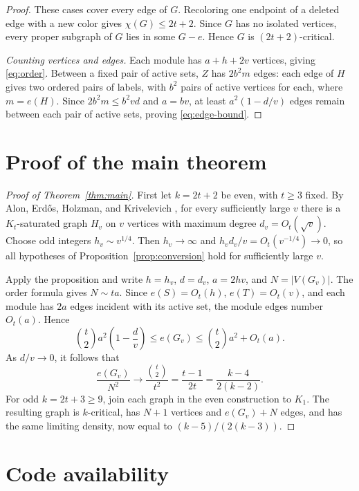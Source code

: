\documentclass[11pt]{article}
\numberwithin{equation}{section}
\begin{document}
\begin{proof}
These cases cover every edge of \(G\). Recoloring one endpoint
of a deleted edge with a new color gives \(\chi(G)\le2t+2\).
Since \(G\) has no isolated vertices, every proper subgraph of
\(G\) lies in some \(G-e\). Hence \(G\) is \((2t+2)\)-critical.

\smallskip
\noindent\emph{Counting vertices and edges.}
Each module has \(a+h+2v\) vertices, giving \eqref{eq:order}.
Between a fixed pair of active sets, \(Z\) has \(2b^2m\) edges:
each edge of \(H\) gives two ordered pairs of labels, with
\(b^2\) pairs of active vertices for each, where \(m=e(H)\).
Since \(2b^2m\le b^2vd\) and \(a=bv\), at least
\(a^2(1-d/v)\) edges remain between each pair of active sets,
proving \eqref{eq:edge-bound}.
\end{proof}

\section{Proof of the main theorem}
\label{sec:main-proof}

\begin{proof}[Proof of Theorem~\ref{thm:main}]
First let \(k=2t+2\) be even, with \(t\ge3\) fixed.
By Alon, Erd\H{o}s, Holzman, and Krivelevich
\cite[Theorem~7]{AEHK}, for every sufficiently large \(v\) there
is a \(K_t\)-saturated graph \(H_v\) on \(v\) vertices with
maximum degree \(d_v=O_t(\sqrt v)\).
Choose odd integers \(h_v\sim v^{1/4}\). Then \(h_v\to\infty\)
and \(h_vd_v/v=O_t(v^{-1/4})\to0\), so all hypotheses of
Proposition~\ref{prop:conversion} hold for sufficiently large \(v\).

Apply the proposition and write \(h=h_v\), \(d=d_v\),
\(a=2hv\), and \(N=|V(G_v)|\). The order formula gives
\(N\sim ta\). Since \(e(S)=O_t(h)\), \(e(T)=O_t(v)\),
and each module has \(2a\) edges incident with its active set,
the module edges number \(O_t(a)\). Hence
\[
 \binom t2a^2\left(1-\frac d v\right)
 \le e(G_v)\le\binom t2a^2+O_t(a).
\]
As \(d/v\to0\), it follows that
\[
 \frac{e(G_v)}{N^2}\longrightarrow
 \frac{\binom t2}{t^2}=\frac{t-1}{2t}
 =\frac{k-4}{2(k-2)}.
\]
For odd \(k=2t+3\ge9\), join each graph in the even construction
to \(K_1\). The resulting graph is \(k\)-critical, has \(N+1\)
vertices and \(e(G_v)+N\) edges, and has the same limiting density,
now equal to \((k-5)/(2(k-3))\).
\end{proof}

\section*{Code availability}
\end{document}
